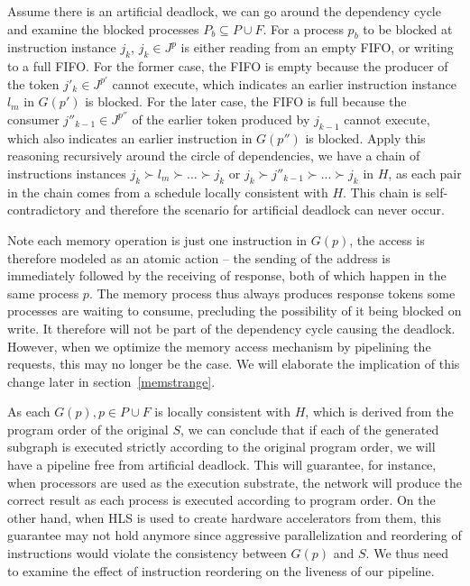 Assume there is an artificial deadlock, we can go around the dependency
cycle and examine the blocked processes $P_b \subseteq P \cup F$. For a process $p_b$
to be blocked at instruction instance $j_k$, $j_k \in J^p$ is either reading from an empty
FIFO, or writing to a full FIFO. For the former case, the FIFO is empty because the producer of the token
$j'_k \in J^{p'}$ cannot execute, which indicates an earlier instruction 
instance $l_m$ in $G(p')$ is blocked. For the later case, the FIFO is full because the consumer $j''_{k-1} \in J^{p''}$ of the earlier token produced by
$j_{k-1}$ cannot execute, which also indicates an earlier instruction in $G(p'')$
is blocked. Apply this reasoning recursively around the circle of dependencies,
we have a chain of instructions instances $j_k \succ l_m \succ ... \succ j_k$
or $j_k \succ j''_{k-1} \succ ... \succ j_k$ in $H$, as each pair in the chain
comes from a schedule locally consistent with $H$. This chain is self-contradictory
and therefore the scenario for artificial deadlock can never occur. 

Note each memory operation is just one instruction in $G(p)$, the
access is therefore modeled as an atomic action -- the sending of the address is immediately followed by the receiving of response, both of which happen in the same process $p$.
The memory process thus always produces response tokens some processes are waiting to consume, precluding the possibility of it being blocked on write. %
It therefore will not be part of the dependency cycle causing the deadlock.
However, when we optimize the memory access mechanism by pipelining the requests, this may no longer be the case. 
We will elaborate the implication of this change later in section~\ref{memstrange}.



As each $G(p), p \in P \cup F$ is locally consistent with $H$, which is derived from
the program order of the original $S$, we can conclude that if each of
the generated subgraph is executed strictly according to the original
program order, we will have a pipeline free from artificial deadlock. This
will guarantee, for instance, when processors are used as the execution substrate, the network will produce the correct result as
each process is executed according to program order. On the other hand, when
HLS is used to create hardware accelerators from them, this guarantee may not
hold anymore since aggressive parallelization and reordering of instructions
would violate the consistency between $G(p)$ and $S$. We thus need to examine
the  effect of instruction reordering on the liveness of our pipeline.



